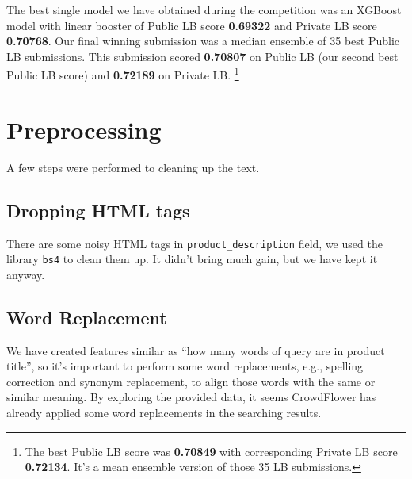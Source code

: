 \documentclass[12pt]{article}
\begin{document}
The best single model we have obtained during the competition was an XGBoost model with linear booster of Public LB score \textbf{0.69322} and Private LB score \textbf{0.70768}. Our final winning submission was a median ensemble of 35 best Public LB submissions. This submission scored \textbf{0.70807} on Public LB (our second best Public LB score) and \textbf{0.72189} on Private LB. \footnote{The best Public LB score was \textbf{0.70849} with corresponding Private LB score \textbf{0.72134}. It's a mean ensemble version of those 35 LB submissions.}

\begin{comment}
\begin{figure}[!htb]
\centering
\begin{tikzpicture}
\draw (-1.5,0) -- (1.5,0);
\draw (0,-1.5) -- (0,1.5);
\end{tikzpicture}
\end{figure}
\end{comment}

\section{Preprocessing}
A few steps were performed to cleaning up the text.
\subsection{Dropping HTML tags}
There are some noisy HTML tags in \texttt{product\_description} field, we used the library \texttt{bs4} to clean them up. It didn't bring much gain, but we have kept it anyway.

\subsection{Word Replacement}
We have created features similar as ``how many words of query are in product title'', so it's important to perform some word replacements, e.g., spelling correction and synonym replacement, to align those words with the same or similar meaning. By exploring the provided data, it seems CrowdFlower has already applied some word replacements in the searching results.
\end{document}
